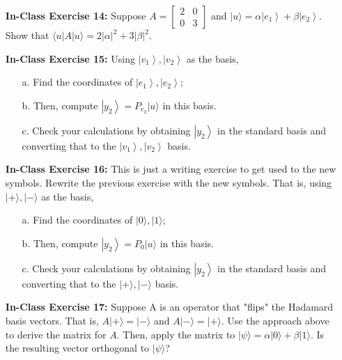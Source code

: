 \documentclass[main.tex]{subfiles}
\begin{document}
\begin{enumerate}
\item[] \textbf{In-Class Exercise 14:} Suppose $A=\left[\begin{array}{ll}2 & 0 \\ 0 & 3\end{array}\right]$ and $|u\rangle=\alpha\left|e_{1}\right\rangle+\beta\left|e_{2}\right\rangle$. Show that $\langle u|A| u\rangle=2|\alpha|^{2}+3|\beta|^{2}$.

\item[] \textbf{In-Class Exercise 15:} Using $\left|v_{1}\right\rangle,\left|v_{2}\right\rangle$ as the basis, 

    \begin{enumerate}
        \item[a.] Find the coordinates of $\left|e_{1}\right\rangle,\left|e_{2}\right\rangle$;
        \item[b.] Then, compute $\left|y_{2}\right\rangle=P_{e_{2}}|u\rangle$ in this basis.
        \item[c.] Check your calculations by obtaining $\left|y_{2}\right\rangle$ in the standard basis and converting that to the $\left|v_{1}\right\rangle,\left|v_{2}\right\rangle$ basis.
    \end{enumerate}

\item[] \textbf{In-Class Exercise 16:} This is just a writing exercise to get used to the new symbols. Rewrite the previous exercise with the new symbols. That is, using $|+\rangle,|-\rangle$ as the basis, 

    \begin{enumerate}
        \item[a.] Find the coordinates of $|0\rangle,|1\rangle$;
        \item[b.] Then, compute $\left|y_{2}\right\rangle=P_{0}|u\rangle$ in this basis.
        \item[c.] Check your calculations by obtaining $\left|y_{2}\right\rangle$ in the standard basis and converting that to the $|+\rangle,|-\rangle$ basis.
    \end{enumerate}

\item[] \textbf{In-Class Exercise 17:} Suppose A is an operator that "flips" the Hadamard basis vectors. That is, $A|+\rangle=|-\rangle$ and $A|-\rangle=|+\rangle$. Use the approach above to derive the matrix for $A$. Then, apply the matrix to $|\psi\rangle=\alpha|0\rangle+\beta|1\rangle$. Is the resulting vector orthogonal to $|\psi\rangle$?


\end{enumerate}
\end{document}
